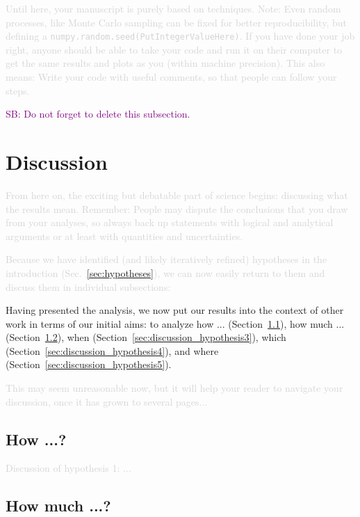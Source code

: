 \documentclass[fleqn,usenatbib]{mnras}
\newcommand{\SB}[1]{{\textcolor{purple}{SB: #1}}}
\newcommand{\comment}[1]{\textcolor{lightgray}{#1}}
\begin{document}
\comment{Until here, your manuscript is purely based on techniques. Note: Even random processes, like Monte Carlo sampling can be fixed for better reproducibility, but defining a \texttt{numpy.random.seed(PutIntegerValueHere)}. If you have done your job right, anyone should be able to take your code and run it on their computer to get the same results and plots as you (within machine precision). This also means: Write your code with useful comments, so that people can follow your steps.}

\SB{Do not forget to delete this subsection.}

\clearpage
\section{Discussion} \label{sec:discussion}

\comment{From here on, the exciting but debatable part of science begins: discussing what the results mean. Remember: People may dispute the conclusions that you draw from your analyses, so always back up statements with logical and analytical arguments or at least with quantities and uncertainties.}

\comment{Because we have identified (and likely iteratively refined) hypotheses in the introduction (Sec.~\ref{sec:hypotheses}), we can now easily return to them and discuss them in individual subsections:}

Having presented the analysis, we now put our results into the context of other work in terms of our initial aims: to analyze how ... (Section~\ref{sec:discussion_hypothesis1}), how much ...  (Section~\ref{sec:discussion_hypothesis2}), when (Section~\ref{sec:discussion_hypothesis3}), which (Section~\ref{sec:discussion_hypothesis4}), and where (Section~\ref{sec:discussion_hypothesis5}).

\comment{This may seem unreasonable now, but it will help your reader to navigate your discussion, once it has grown to several pages...}

\subsection{How ...?} \label{sec:discussion_hypothesis1}

\comment{Discussion of hypothesis 1: ...}

\subsection{How much ...?} \label{sec:discussion_hypothesis2}
\end{document}
